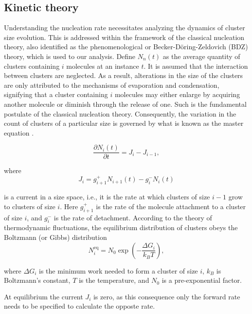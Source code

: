 \subsection{Kinetic theory}
Understanding the nucleation rate necessitates analyzing the dynamics of cluster size evolution. This is addressed 
within the framework of the classical nucleation theory, also identified as the phenomenological or Becker-Döring-Zeldovich (BDZ) theory, 
which is used to our analysis. Define \( N_n(t) \) as the average quantity of clusters containing \( i \) molecules at an instance \( t \). 
It is assumed that the interaction between clusters are neglected. As a result, alterations in the size of the clusters are only 
attributed to the mechanisms of evaporation and condensation, signifying that a cluster containing \( i \) molecules may either enlarge by acquiring another 
molecule or diminish through the release of one. Such is the fundamental postulate of the classical nucleation theory. Consequently, the variation in the 
count of clusters of a particular size is governed by what is known as the master equation \cite{Larissa}.

\begin{equation}
\frac{\partial N_i(t)}{\partial t} = J_{i} - J_{i-1},
\label{eq:master_equation}
\end{equation}

where
\begin{equation}
J_i = g^+_{i+1} N_{i+1}(t) - g^-_i N_i(t)
\label{eq:current_size_space}
\end{equation}

is a current in a size space, i.e., it is the rate at which clusters of size \( i-1 \) grow to clusters of 
size \( i \). Here \( g^+_{i+1} \) is the rate of the molecule attachment to a cluster of size \( i \), and \( g^-_i \) 
is the rate of detachment. According to the theory of thermodynamic fluctuations, the equilibrium distribution of clusters obeys the Boltzmann (or Gibbs) distribution
\begin{equation}
N^{\text{eq}}_i = N_0 \exp \left( -\frac{\Delta G_i}{k_B T} \right),
\label{eq:boltzmann_distribution}
\end{equation}

where \(\Delta G_i\) is the minimum work needed to form a cluster of size \(i\), \(k_B\) is Boltzmann’s 
constant, \(T\) is the temperature, and \(N_0\) is a pre-exponential factor.

At equilibrium the current \(J_i\) is zero, as this consequence only the forward rate needs to be specified to calculate the opposte rate.

